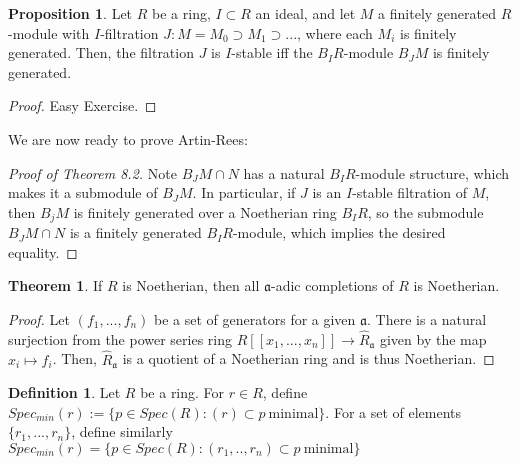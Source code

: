 \documentclass{article}
\theoremstyle{definition}
\newtheorem{theorem}{Theorem}[section]
\theoremstyle{definition}
\theoremstyle{definition}
\newtheorem{proposition}{Proposition}[section]
\theoremstyle{definition}
\theoremstyle{definition}
\newtheorem{definition}{Definition}[section]
\theoremstyle{definition}
\theoremstyle{definition}
\begin{document}
\begin{tcolorbox}[colback=blue!5!white,colframe=blue!30!white]
\begin{proposition}
Let $R$ be a ring, $I\subset R$ an ideal, and let $M$ a finitely generated $R$-module with $I$-filtration $J: M=M_0\supset M_1\supset...$, where each $M_i$ is finitely generated. Then, the filtration $J$ is $I$-stable iff the $B_IR$-module $B_JM$ is finitely generated. 
\end{proposition}
\end{tcolorbox}
\begin{proof}
    Easy Exercise. 
\end{proof}

We are now ready to prove Artin-Rees: 
\begin{proof}[Proof of Theorem 8.2]
    Note $ B_J M\cap N$ has a natural $B_I R$-module structure, which makes it a submodule of $B_JM$. In particular, if $J$ is an $I$-stable filtration of $M$, then $B_jM$ is finitely generated over a Noetherian ring $B_IR$, so the submodule $ B_J M\cap N$ is a finitely generated $B_I R$-module, which implies the desired equality. 
\end{proof}







\begin{tcolorbox}[colback=red!5!white,colframe=red!30!white]
\begin{theorem}
If $R$ is Noetherian, then all $\mathfrak{a}$-adic completions of $R$ is Noetherian. 
\end{theorem}
\end{tcolorbox}
\begin{proof}
    Let $(f_1,...,f_n)$ be a set of generators for a given $\mathfrak{a}$. There is a natural surjection from the power series ring $R[[x_1,...,x_n]]\to \widehat{R}_{\mathfrak{a}}$ given by the map $x_i\mapsto f_i$. Then, $\widehat{R}_{\mathfrak{a}}$ is a quotient of a Noetherian ring and is thus Noetherian.
\end{proof}






\begin{tcolorbox}[colback=purple!5!white,colframe=purple!75!black]
\begin{definition}
Let $R$ be a ring. For $r\in R$, define $Spec_{min}(r):=\{p\in Spec(R) : (r)\subset p \ \textrm{minimal}\}$. For a set of elements $\{r_1,...,r_n\}$, define similarly $Spec_{min}(r)=\{p\in Spec(R) : (r_1,..,r_n)\subset p \ \textrm{minimal}\}$
\end{definition}
\end{tcolorbox}
\end{document}
